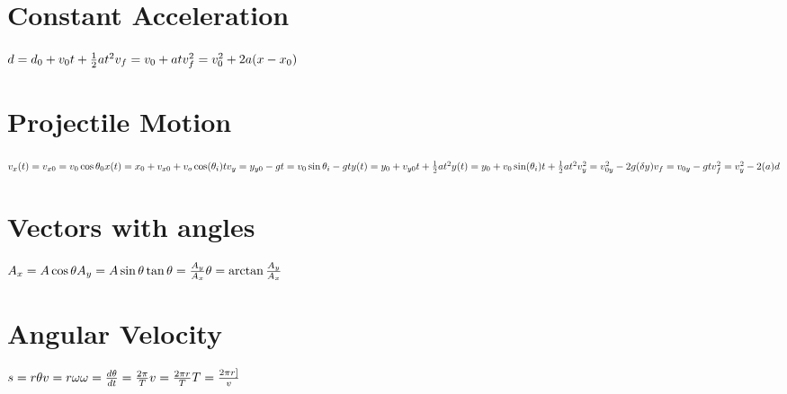 \documentclass[11pt]{article}
\begin{document}
    \begin{paracol}{3}
        \section*{Constant Acceleration}
        \begin{fleqn}
            $
            d=d_0+v_0t + \frac{1}{2}at^2 \newline
            v_f=v_0+at \newline
            v^2_f = v_0^2 +2a(x-x _0) \newline
            $
        \end{fleqn}
        \section*{Projectile Motion}
        \begin{fleqn}
            $
            v_x(t)=v_{x0} = v_0 \cos \theta_0 \newline
            x(t) = x_0 + v_{x0} + v_o \cos(\theta_i)t \newline
            v_y = y_{y0} -gt = v_0\sin \theta_i -gt \newline
            y(t) = y_0 + v_{y0}t+ \frac{1}{2} at^2 \newline
            y(t) = y_0 +v_0 \sin(\theta_i)t +\frac{1}{2}at^2 \newline
            v^2_y = v_{0y}^2 -2g(\delta y) \newline
            v_f=v_{0y}-gt \newline
            v_f^2 = v_y^2 -2(a)d\newline
            $
        \end{fleqn}
        \section*{Vectors with angles}
        \begin{fleqn}
            $
            A_x=A\cos\theta \newline
            A_y=A\sin\theta \newline
            \tan\theta = \frac{A_y}{A_x} \newline
            \theta = \arctan\frac{A_y}{A_x} \newline
            $
        \end{fleqn}

        \section*{Angular Velocity}
        \begin{fleqn}
            $
            s=r\theta \newline
            v=r\omega \newline
            \omega = \frac{d\theta}{dt} = \frac{2\pi}{T} \newline
            v = \frac{2\pi r}{T} \newline
            T = \frac{2\pi r]}{v} \newline
            $
        \end{fleqn}

\end{paracol}
\end{document}
